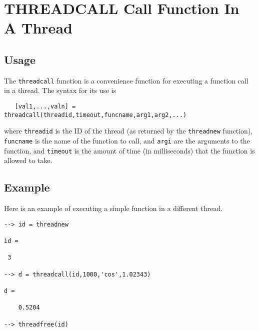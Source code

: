 \section{THREADCALL Call Function In A Thread}

\subsection{Usage}

The \verb|threadcall| function is a convenience function for executing
a function call in a thread.  The syntax for its use is
\begin{verbatim}
   [val1,...,valn] = threadcall(threadid,timeout,funcname,arg1,arg2,...)
\end{verbatim}
where \verb|threadid| is the ID of the thread (as returned by the
\verb|threadnew| function), \verb|funcname| is the name of the function to call,
and \verb|argi| are the arguments to the function, and \verb|timeout| is the
amount of time (in milliseconds) that the function is allowed to take.
\subsection{Example}

Here is an example of executing a simple function in a different thread.
\begin{verbatim}
--> id = threadnew

id = 

 3 

--> d = threadcall(id,1000,'cos',1.02343)

d = 

    0.5204 

--> threadfree(id)
\end{verbatim}
